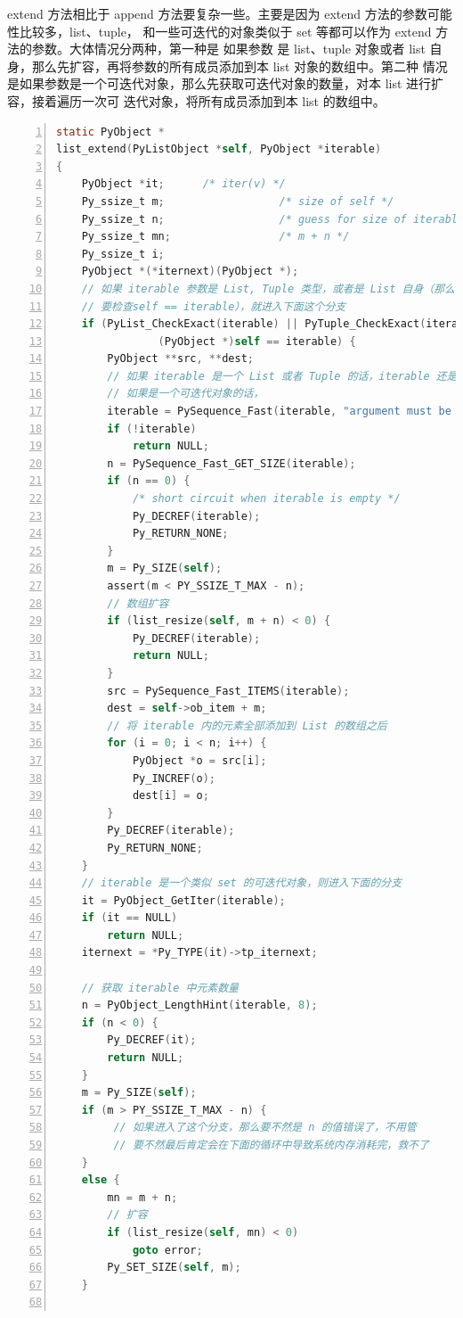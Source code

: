 extend 方法相比于 append 方法要复杂一些。主要是因为 extend 方法的参数可能性比较多，list、tuple，
和一些可迭代的对象类似于 set 等都可以作为 extend 方法的参数。大体情况分两种，第一种是 如果参数
是 list、tuple 对象或者 list 自身，那么先扩容，再将参数的所有成员添加到本 list 对象的数组中。第二种
情况是如果参数是一个可迭代对象，那么先获取可迭代对象的数量，对本 list 进行扩容，接着遍历一次可
迭代对象，将所有成员添加到本 list 的数组中。

\begin{lstlisting}[language=C, numbers=left, numbersep=1em, numberstyle=\footnotesize , breaklines=true]
static PyObject *
list_extend(PyListObject *self, PyObject *iterable)
{
    PyObject *it;      /* iter(v) */
    Py_ssize_t m;                  /* size of self */
    Py_ssize_t n;                  /* guess for size of iterable */
    Py_ssize_t mn;                 /* m + n */
    Py_ssize_t i;
    PyObject *(*iternext)(PyObject *);
    // 如果 iterable 参数是 List, Tuple 类型，或者是 List 自身（那么当然也是一个 List 了，所以为什么还
    // 要检查self == iterable），就进入下面这个分支
    if (PyList_CheckExact(iterable) || PyTuple_CheckExact(iterable) ||
                (PyObject *)self == iterable) {
        PyObject **src, **dest;
        // 如果 iterable 是一个 List 或者 Tuple 的话，iterable 还是自身
        // 如果是一个可迭代对象的话，
        iterable = PySequence_Fast(iterable, "argument must be iterable");
        if (!iterable)
            return NULL;
        n = PySequence_Fast_GET_SIZE(iterable);
        if (n == 0) {
            /* short circuit when iterable is empty */
            Py_DECREF(iterable);
            Py_RETURN_NONE;
        }
        m = Py_SIZE(self);
        assert(m < PY_SSIZE_T_MAX - n);
        // 数组扩容
        if (list_resize(self, m + n) < 0) {
            Py_DECREF(iterable);
            return NULL;
        }
        src = PySequence_Fast_ITEMS(iterable);
        dest = self->ob_item + m;
        // 将 iterable 内的元素全部添加到 List 的数组之后
        for (i = 0; i < n; i++) {
            PyObject *o = src[i];
            Py_INCREF(o);
            dest[i] = o;
        }
        Py_DECREF(iterable);
        Py_RETURN_NONE;
    }
    // iterable 是一个类似 set 的可迭代对象，则进入下面的分支
    it = PyObject_GetIter(iterable);
    if (it == NULL)
        return NULL;
    iternext = *Py_TYPE(it)->tp_iternext;

    // 获取 iterable 中元素数量
    n = PyObject_LengthHint(iterable, 8);
    if (n < 0) {
        Py_DECREF(it);
        return NULL;
    }
    m = Py_SIZE(self);
    if (m > PY_SSIZE_T_MAX - n) {
         // 如果进入了这个分支，那么要不然是 n 的值错误了，不用管
         // 要不然最后肯定会在下面的循环中导致系统内存消耗完，救不了
    }
    else {
        mn = m + n;
        // 扩容
        if (list_resize(self, mn) < 0)
            goto error;
        Py_SET_SIZE(self, m);
    }


\end{lstlisting}
